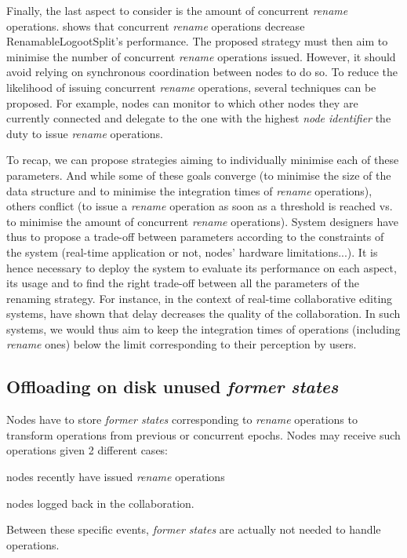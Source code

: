 \documentclass[10pt,journal,compsoc]{IEEEtran}
\begin{document}
Finally, the last aspect to consider is the amount of concurrent \emph{rename} operations.
 shows that concurrent \emph{rename} operations decrease RenamableLogootSplit's performance.
The proposed strategy must then aim to minimise the number of concurrent \emph{rename} operations issued.
However, it should avoid relying on synchronous coordination between nodes to do so.
To reduce the likelihood of issuing concurrent \emph{rename} operations, several techniques can be proposed.
For example, nodes can monitor to which other nodes they are currently connected and delegate to the one with the highest \emph{node identifier} the duty to issue \emph{rename} operations.

To recap, we can propose strategies aiming to individually minimise each of these parameters.
And while some of these goals converge (to minimise the size of the data structure and to minimise the integration times of \emph{rename} operations), others conflict (to issue a \emph{rename} operation as soon as a threshold is reached vs. to minimise the amount of concurrent \emph{rename} operations).
System designers have thus to propose a trade-off between parameters according to the constraints of the system (real-time application or not, nodes’ hardware limitations...).
It is hence necessary to deploy the system to evaluate its performance on each aspect, its usage and to find the right trade-off between all the parameters of the renaming strategy.
For instance, in the context of real-time collaborative editing systems, \cite{ignat:hal-01088815} have shown that delay decreases the quality of the collaboration.
In such systems, we would thus aim to keep the integration times of operations (including \emph{rename} ones) below the limit corresponding to their perception by users.

\subsection{Offloading on disk unused \emph{former states}}
\label{sec:offloading-former-states}

Nodes have to store \emph{former states} corresponding to \emph{rename} operations to transform operations from previous or concurrent epochs.
Nodes may receive such operations given 2 different cases:
\begin{enumerate*}[label=(\roman*)]
    \item nodes recently have issued \emph{rename} operations
    \item nodes logged back in the collaboration.
\end{enumerate*}
Between these specific events, \emph{former states} are actually not needed to handle operations.
\end{document}

